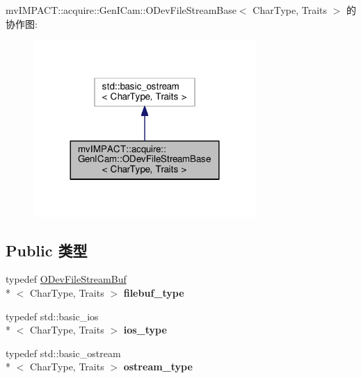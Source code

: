 mv\+I\+M\+P\+A\+C\+T\+:\+:acquire\+:\+:Gen\+I\+Cam\+:\+:O\+Dev\+File\+Stream\+Base$<$ Char\+Type, Traits $>$ 的协作图\+:
\nopagebreak
\begin{figure}[H]
\begin{center}
\leavevmode
\includegraphics[width=240pt]{classmv_i_m_p_a_c_t_1_1acquire_1_1_gen_i_cam_1_1_o_dev_file_stream_base__coll__graph}
\end{center}
\end{figure}
\subsection*{Public 类型}
\begin{DoxyCompactItemize}
\item 
\hypertarget{classmv_i_m_p_a_c_t_1_1acquire_1_1_gen_i_cam_1_1_o_dev_file_stream_base_a265e25b3c50f9ed8baa2ea7c66da8aee}{typedef \hyperlink{classmv_i_m_p_a_c_t_1_1acquire_1_1_gen_i_cam_1_1_o_dev_file_stream_buf}{O\+Dev\+File\+Stream\+Buf}\\*
$<$ Char\+Type, Traits $>$ {\bfseries filebuf\+\_\+type}}\label{classmv_i_m_p_a_c_t_1_1acquire_1_1_gen_i_cam_1_1_o_dev_file_stream_base_a265e25b3c50f9ed8baa2ea7c66da8aee}

\item 
\hypertarget{classmv_i_m_p_a_c_t_1_1acquire_1_1_gen_i_cam_1_1_o_dev_file_stream_base_ae4b2f4003b32aecc31cfa65195fca210}{typedef std\+::basic\+\_\+ios\\*
$<$ Char\+Type, Traits $>$ {\bfseries ios\+\_\+type}}\label{classmv_i_m_p_a_c_t_1_1acquire_1_1_gen_i_cam_1_1_o_dev_file_stream_base_ae4b2f4003b32aecc31cfa65195fca210}

\item 
\hypertarget{classmv_i_m_p_a_c_t_1_1acquire_1_1_gen_i_cam_1_1_o_dev_file_stream_base_a84f8e54569c81a22f56d48813662c832}{typedef std\+::basic\+\_\+ostream\\*
$<$ Char\+Type, Traits $>$ {\bfseries ostream\+\_\+type}}\label{classmv_i_m_p_a_c_t_1_1acquire_1_1_gen_i_cam_1_1_o_dev_file_stream_base_a84f8e54569c81a22f56d48813662c832}

\end{DoxyCompactItemize}
